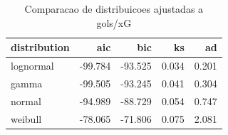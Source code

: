 \begin{table}

\caption{\label{tab:ajuste_dist_g20}Comparacao de distribuicoes ajustadas a gols/xG}
\centering
\begin{tabular}[t]{lrrrr}
\toprule
distribution & aic & bic & ks & ad\\
\midrule
lognormal & -99.784 & -93.525 & 0.034 & 0.201\\
gamma & -99.505 & -93.245 & 0.041 & 0.304\\
normal & -94.989 & -88.729 & 0.054 & 0.747\\
weibull & -78.065 & -71.806 & 0.075 & 2.081\\
\bottomrule
\end{tabular}
\end{table}
